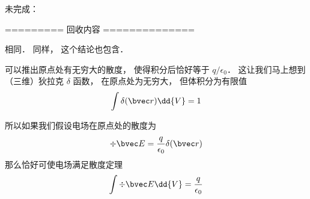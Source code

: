 未完成： 

========= 回收内容 ==============

相同． 同样， 这个结论也包含．

可以推出原点处有无穷大的散度， 使得积分后恰好等于 $q/\epsilon_0$． 这让我们马上想到（三维）狄拉克 $\delta$ 函数， 在原点处为无穷大， 但体积分为有限值
\begin{equation}
\int \delta(\bvec r)\dd{V} = 1
\end{equation}

所以如果我们假设电场在原点处的散度为
\begin{equation}
\div \bvec E = \frac{q}{\epsilon_0}\delta(\bvec r)
\end{equation}
那么恰好可使电场满足散度定理
\begin{equation}
\int \div \bvec E \dd{V} = \frac{q}{\epsilon_0}
\end{equation}
